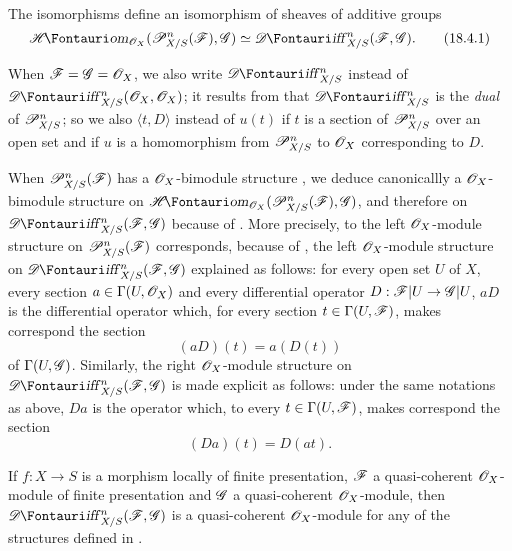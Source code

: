 \begin{proposition}[16.8.4]
\label{IV.16.8.4}
The isomorphisms  define an isomorphism of sheaves of additive groups
\[
  \label{IV.16.8.4.1}
  \shHom_{\sh{O}_X}(\sh{P}_{X/S}^n(\sh{F}), \sh{G}) \isoto \shDiff_{X/S}^n(\sh{F}, \sh{G}).
  \tag{18.4.1}
\]
\end{proposition}

When $\mathscr{F} = \mathscr{G} = \mathscr{O}_X$, we also write $\shDiff_{X/S}^n$ instead of $\shDiff_{X/S}^n(\sh{O}_X, \sh{O}_X)$;
it results from  that $\shDiff_{X/S}^n$ is the \emph{dual} of $\mathscr{P}_{X/S}^n$;
so we also $\langle t, D \rangle$ instead of $u(t)$ if $t$ is a section of $\mathscr{P}_{X/S}^n$ over an open set and if $u$ is a homomorphism from $\mathscr{P}_{X/S}^n$ to $\mathscr{O}_X$ corresponding to $D$.

\begin{env}[16.8.5]
\label{IV.16.8.5}
When $\mathscr{P}_{X/S}^n(\mathscr{F})$ has a $\mathscr{O}_X$-bimodule structure , we deduce canonicallly a $\mathscr{O}_X$-bimodule structure on $\shHom_{\sh{O}_X}(\sh{P}_{X/S}^n(\sh{F}), \sh{G})$, and therefore on $\shDiff_{X/S}^n(\sh{F}, \sh{G})$ because of .
More precisely, to the left $\mathscr{O}_X$-module structure on $\mathscr{P}_{X/S}^n(\mathscr{F})$ corresponds, because of , the left $\mathscr{O}_X$-module structure on $\shDiff_{X/S}^n(\sh{F}, \sh{G})$ explained as follows:
for every open set $U$ of $X$, every section $a \in \Gamma(U, \mathscr{O}_X)$ and every differential operator $D: \sh{F}|U \to \sh{G}|U$, $aD$ is the differential operator which, for every section $t \in \Gamma(U, \mathscr{F})$, makes correspond the section
\[
  \label{IV.16.8.5.1}
  (aD)(t) = a(D(t))
  \tag{16.8.5.1}
\]
of $\Gamma(U, \mathscr{G})$.
Similarly, the right $\mathscr{O}_X$-module structure on $\shDiff_{X/S}^n(\sh{F}, \sh{G})$ is made explicit as follows:
under the same notations as above, $Da$ is the operator which, to every $t \in \Gamma(U, \mathscr{F})$, makes correspond the section
\[
  \label{IV.16.8.5.2}
  (Da)(t) = D(at).
  \tag{16.8.5.2}
\]
\end{env}

\begin{proposition}[16.8.6]
\label{IV.16.8.6}
If $f:X \to S$ is a morphism locally of finite presentation, $\mathscr{F}$ a quasi-coherent $\mathscr{O}_X$-module of finite presentation and $\mathscr{G}$ a quasi-coherent $\mathscr{O}_X$-module, then $\shDiff_{X/S}^n(\sh{F}, \sh{G})$ is a quasi-coherent $\mathscr{O}_X$-module for any of the structures defined in .
\end{proposition}

